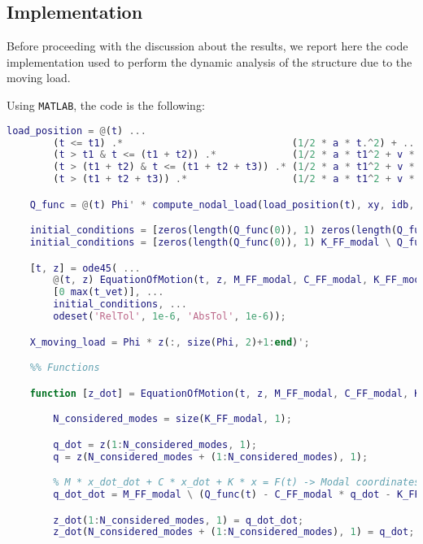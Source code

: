 \subsection{Implementation}
\label{subsec:implementation}

Before proceeding with the discussion about the results, we report here the code implementation used to perform the dynamic analysis of the structure due to the moving load.

Using \texttt{MATLAB}, the code is the following:

\begin{lstlisting}[language=Matlab, caption={Implementation of the moving load dynamic analysis.}]
    load_position = @(t) ...
        (t <= t1) .*                             (1/2 * a * t.^2) + ...
        (t > t1 & t <= (t1 + t2)) .*             (1/2 * a * t1^2 + v * (t - t1)) + ...
        (t > (t1 + t2) & t <= (t1 + t2 + t3)) .* (1/2 * a * t1^2 + v * t2 + v * (t - (t2 + t1)) - 1/2 * a * (t - (t1 + t2)).^2) + ...
        (t > (t1 + t2 + t3)) .*                  (1/2 * a * t1^2 + v * t2 + v * t3 - 1/2 * a * t3.^2);

    Q_func = @(t) Phi' * compute_nodal_load(load_position(t), xy, idb, -9.81 * 40e3);

    initial_conditions = [zeros(length(Q_func(0)), 1) zeros(length(Q_func(0)), 1)];
    initial_conditions = [zeros(length(Q_func(0)), 1) K_FF_modal \ Q_func(0)];

    [t, z] = ode45( ...
        @(t, z) EquationOfMotion(t, z, M_FF_modal, C_FF_modal, K_FF_modal, Q_func), ...
        [0 max(t_vet)], ...
        initial_conditions, ...
        odeset('RelTol', 1e-6, 'AbsTol', 1e-6));

    X_moving_load = Phi * z(:, size(Phi, 2)+1:end)';

    %% Functions

    function [z_dot] = EquationOfMotion(t, z, M_FF_modal, C_FF_modal, K_FF_modal, Q_func)

        N_considered_modes = size(K_FF_modal, 1);

        q_dot = z(1:N_considered_modes, 1);
        q = z(N_considered_modes + (1:N_considered_modes), 1);

        % M * x_dot_dot + C * x_dot + K * x = F(t) -> Modal coordinates -> q
        q_dot_dot = M_FF_modal \ (Q_func(t) - C_FF_modal * q_dot - K_FF_modal * q);

        z_dot(1:N_considered_modes, 1) = q_dot_dot;
        z_dot(N_considered_modes + (1:N_considered_modes), 1) = q_dot;


\end{lstlisting}
